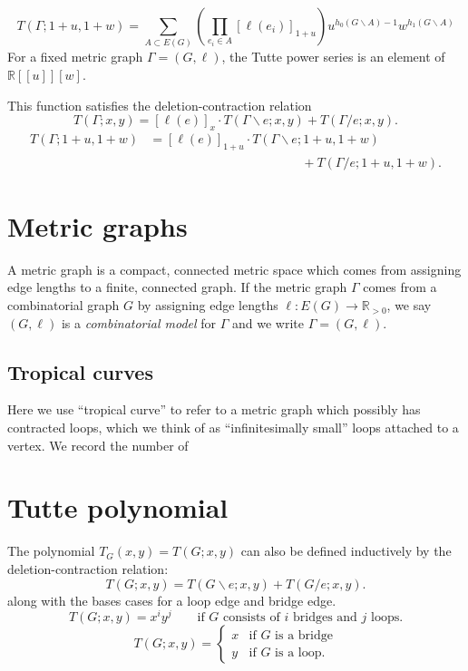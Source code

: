 \documentclass{amsart}
\theoremstyle{definition}
\newcommand{\RR}{\mathbb{R}}
\begin{document}
\begin{equation*}
T(\Gamma; 1+u,1+w) = \sum_{A \subset E(G)} \left( \prod_{e_i \in A} [\ell(e_i)]_{1+u} \right)
u^{h_0(G\backslash A) - 1}w^{h_1(G\backslash A)}
\end{equation*}
For a fixed metric graph $\Gamma = (G,\ell)$, the Tutte power series is an element of 
$\RR[[u]][w]$.

This function satisfies the deletion-contraction relation
\begin{equation*}
T(\Gamma; x,y) = [\ell(e)]_x \cdot T(\Gamma \backslash e; x,y) + T(\Gamma / e; x,y) .
\end{equation*}
\begin{align*}
T({\Gamma};1+u,1+w) &= 
[\ell(e)]_{1+u} \cdot T(\Gamma \backslash e; 1+u,1+w) \\
&\qquad\qquad\qquad\qquad\qquad\qquad
 + T(\Gamma / e; 1+u,1+w) .
\end{align*}

\section{Metric graphs}
A metric graph is a compact, connected metric space which comes from 
assigning edge lengths to a finite, connected graph.
If the metric graph $\Gamma$
comes from a combinatorial graph $G$ by 
assigning edge lengths $\ell : E(G) \to \RR_{>0}$,
we say $(G,\ell)$ is a {\em combinatorial model} for $\Gamma$
and we write $\Gamma = (G,\ell)$.


\subsection{Tropical curves}

Here we use ``tropical curve'' 
to refer to a metric graph which possibly has contracted loops,
which we think of as ``infinitesimally small'' loops attached to a vertex.
We record the number of 

\section{Tutte polynomial}
The polynomial $T_G(x,y) = T(G; x,y)$ can also be defined inductively by the 
deletion-contraction relation:
\begin{equation*}
T(G;x,y) = T(G \backslash e; x,y) + T(G / e; x,y).
\end{equation*}
along with the bases cases for a loop edge and bridge edge.
\begin{equation*}
T(G; x,y) = x^i y^j \qquad\text{if $G$ consists of $i$ bridges and $j$ loops.}
\end{equation*}
\begin{equation*}
T(G;x,y) = \begin{cases}
x & \text{if $G$ is a bridge} \\
y & \text{if $G$ is a loop}.
\end{cases}
\end{equation*}
\end{document}
